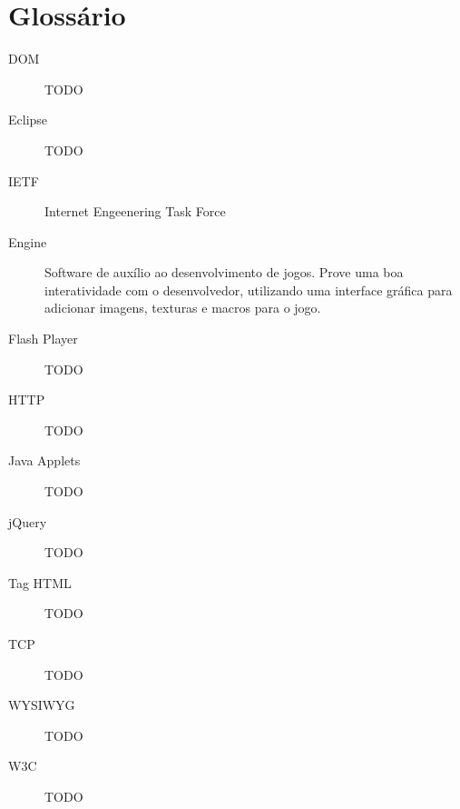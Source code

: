
\section*{Glossário}

\begin{description}
\item[DOM ] TODO
\item[Eclipse ] TODO
\item[IETF ] Internet Engeenering Task Force
\item[Engine ] Software de auxílio ao desenvolvimento de jogos. Prove
uma boa interatividade com o desenvolvedor, utilizando uma interface
gráfica para adicionar imagens, texturas e macros para o jogo.
\item[Flash Player ] TODO
\item[HTTP ] TODO
\item[Java Applets ] TODO
\item[jQuery ] TODO
\item[Tag HTML ] TODO
\item[TCP ] TODO
\item[WYSIWYG ] TODO
\item[W3C ] TODO

\end{description}

\newpage
